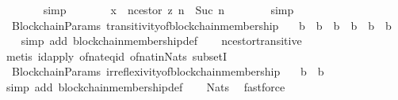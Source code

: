 \begin{isabellebody}
\ \ \ \ \ \ \isamarkupfalse%
\ simp\isanewline
\ \ \ \ \isamarkupfalse%
\ \isamarkupfalse%
\ {\isachardoublequoteopen}x\ {\isacharequal}\ n{\isacharunderscore}cestor\ {\isacharparenleft}z{\isacharcomma}\ n{}\ {\isacharplus}\ Suc\ n{}{\isacharparenright}{\isachardoublequoteclose}\isanewline
\ \ \ \ \ \ \isamarkupfalse%
\ simp\isanewline
\ \ \isamarkupfalse%
\isanewline
{}\isamarkupfalse%
%
\endisatagproof
{\isafoldproof}%
%
\isadelimproof
\isanewline
%
\endisadelimproof
\isanewline
{}\isamarkupfalse%
\ {\isacharparenleft}\ BlockchainParams{\isacharparenright}\ transitivity{\isacharunderscore}of{\isacharunderscore}blockchain{\isacharunderscore}membership\ {\isacharcolon}\isanewline
\ \ {\isachardoublequoteopen}b{}\ {\isasymdownharpoonright}\ b{}\ {\isasymand}\ b{}\ {\isasymdownharpoonright}\ b{}\ {\isasymLongrightarrow}\ b{}\ {\isasymdownharpoonright}\ b{}{\isachardoublequoteclose}\isanewline
%
\isadelimproof
\ \ %
\endisadelimproof
%
\isatagproof
{}\isamarkupfalse%
\ {\isacharparenleft}simp\ add{\isacharcolon}\ blockchain{\isacharunderscore}membership{\isacharunderscore}def{\isacharparenright}\isanewline
\ \ \isamarkupfalse%
\ n{\isacharunderscore}cestor{\isacharunderscore}transitive\isanewline
\ \ \isamarkupfalse%
\ {\isacharparenleft}metis\ id{\isacharunderscore}apply\ of{\isacharunderscore}nat{\isacharunderscore}eq{\isacharunderscore}id\ of{\isacharunderscore}nat{\isacharunderscore}in{\isacharunderscore}Nats\ subsetI{\isacharparenright}%
\endisatagproof
{\isafoldproof}%
%
\isadelimproof
\isanewline
%
\endisadelimproof
\isanewline
{}\isamarkupfalse%
\ {\isacharparenleft}\ BlockchainParams{\isacharparenright}\ irreflexivity{\isacharunderscore}of{\isacharunderscore}blockchain{\isacharunderscore}membership\ {\isacharcolon}\isanewline
\ \ {\isachardoublequoteopen}b\ {\isasymdownharpoonright}\ b{\isachardoublequoteclose}\isanewline
%
\isadelimproof
\ \ %
\endisadelimproof
%
\isatagproof
{}\isamarkupfalse%
\ {\isacharparenleft}simp\ add{\isacharcolon}\ blockchain{\isacharunderscore}membership{\isacharunderscore}def{\isacharparenright}\isanewline
\ \ \isamarkupfalse%
\ Nats{\isacharunderscore}{}\ \isamarkupfalse%
\ fastforce%
\endisatagproof
{\isafoldproof}%
%
\isadelimproof
\isanewline
%
\endisadelimproof

\end{isabellebody}
